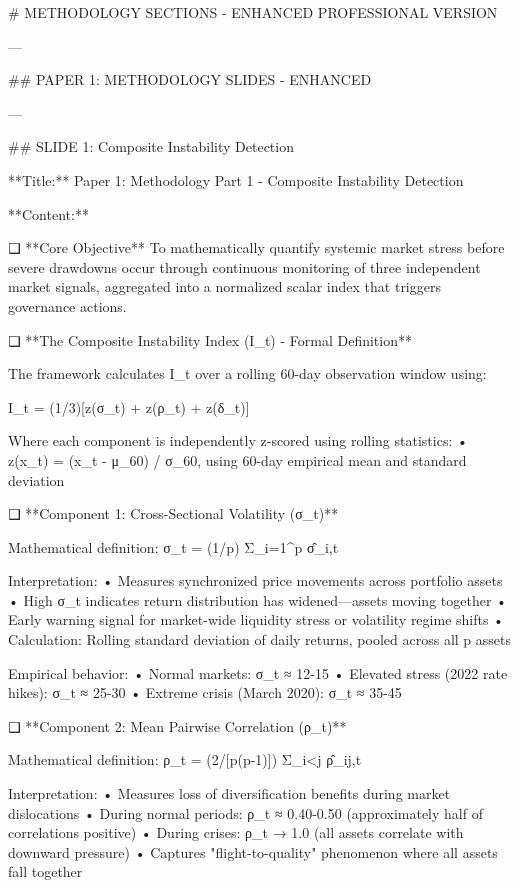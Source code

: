 # METHODOLOGY SECTIONS - ENHANCED PROFESSIONAL VERSION

---

## PAPER 1: METHODOLOGY SLIDES - ENHANCED

---

## SLIDE 1: Composite Instability Detection

**Title:** Paper 1: Methodology Part 1 - Composite Instability Detection

**Content:**

❑ **Core Objective**
To mathematically quantify systemic market stress before severe drawdowns occur through continuous monitoring of three independent market signals, aggregated into a normalized scalar index that triggers governance actions.

❑ **The Composite Instability Index (I_t) - Formal Definition**

The framework calculates I_t over a rolling 60-day observation window using:

I_t = (1/3)[z(σ_t) + z(ρ_t) + z(δ_t)]

Where each component is independently z-scored using rolling statistics:
   • z(x_t) = (x_t - μ_60) / σ_60, using 60-day empirical mean and standard deviation

❑ **Component 1: Cross-Sectional Volatility (σ_t)**

Mathematical definition: σ_t = (1/p) Σ_{i=1}^p σ̂_{i,t}

Interpretation:
   • Measures synchronized price movements across portfolio assets
   • High σ_t indicates return distribution has widened—assets moving together
   • Early warning signal for market-wide liquidity stress or volatility regime shifts
   • Calculation: Rolling standard deviation of daily returns, pooled across all p assets

Empirical behavior:
   • Normal markets: σ_t ≈ 12-15%
   • Elevated stress (2022 rate hikes): σ_t ≈ 25-30%
   • Extreme crisis (March 2020): σ_t ≈ 35-45%

❑ **Component 2: Mean Pairwise Correlation (ρ_t)**

Mathematical definition: ρ_t = (2/[p(p-1)]) Σ_{i<j} ρ̂_{ij,t}

Interpretation:
   • Measures loss of diversification benefits during market dislocations
   • During normal periods: ρ_t ≈ 0.40-0.50 (approximately half of correlations positive)
   • During crises: ρ_t → 1.0 (all assets correlate with downward pressure)
   • Captures "flight-to-quality" phenomenon where all assets fall together

